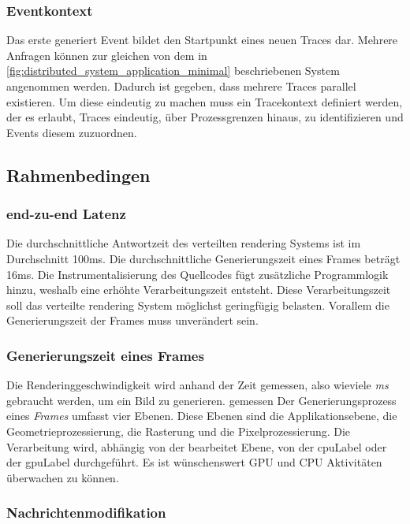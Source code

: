 \subsubsection{Eventkontext}
\label{subsubsection:Eventkontext}
Das erste generiert Event bildet den Startpunkt eines neuen Traces dar. Mehrere Anfragen können zur gleichen von dem in \cref{fig:distributed_system_application_minimal} beschriebenen System angenommen werden. Dadurch ist gegeben, dass mehrere Traces parallel existieren. Um diese eindeutig zu machen muss ein Tracekontext definiert werden, der es erlaubt, Traces eindeutig, über Prozessgrenzen hinaus, zu identifizieren und Events diesem zuzuordnen.

\subsection{Rahmenbedingen}
\label{subsection:Rahmenbedingen}
\subsubsection{end-zu-end Latenz}
\label{subsubsection:end-zu-end Latenz}
Die durchschnittliche Antwortzeit des verteilten rendering Systems ist im Durchschnitt 100ms. Die durchschnittliche Generierungszeit eines Frames beträgt 16ms. Die Instrumentalisierung des Quellcodes fügt zusätzliche Programmlogik hinzu, weshalb eine erhöhte Verarbeitungszeit entsteht. Diese Verarbeitungszeit soll das verteilte rendering System möglichst geringfügig belasten. Vorallem die Generierungszeit der Frames muss unverändert sein.

\subsubsection{Generierungszeit eines Frames}
\label{subsubsection:Generierungszeit eines Frames}
Die Renderinggeschwindigkeit wird anhand der Zeit gemessen, also wieviele \emph{ms} gebraucht werden, um ein Bild zu generieren. gemessen Der Generierungsprozess eines \emph{Frames} umfasst vier Ebenen. Diese Ebenen sind die Applikationsebene, die Geometrieprozessierung, die Rasterung und die Pixelprozessierung. Die Verarbeitung wird, abhängig von der bearbeitet Ebene, von der \gls{cpuLabel} oder der \gls{gpuLabel} durchgeführt. Es ist wünschenswert GPU und CPU Aktivitäten überwachen zu können.

\subsubsection{Nachrichtenmodifikation}
\label{subsubsection:Nachrichtenmodifikation}

